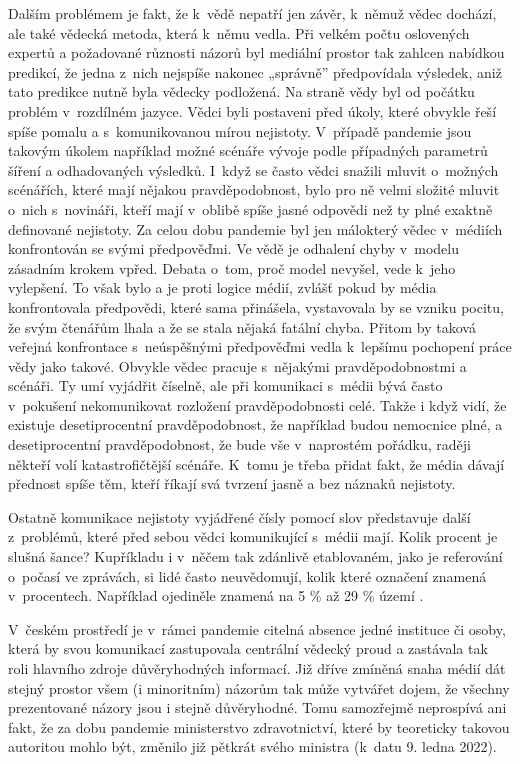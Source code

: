Dalším problémem je fakt, že k~vědě nepatří jen závěr, k~němuž vědec dochází, ale také vědecká metoda, která k~němu vedla. Při velkém počtu oslovených expertů a požadované  různosti názorů byl mediální prostor tak zahlcen nabídkou predikcí, že jedna z~nich nejspíše nakonec „správně” předpovídala výsledek, aniž tato predikce nutně byla vědecky podložená.
Na straně vědy byl od počátku problém v~rozdílném jazyce. Vědci byli postaveni před úkoly, které obvykle řeší spíše pomalu a s~komunikovanou mírou nejistoty. V~případě pandemie jsou takovým úkolem například možné scénáře vývoje podle případných parametrů šíření a odhadovaných výsledků. I~když se často vědci snažili mluvit o~možných scénářích, které mají nějakou pravděpodobnost, bylo pro ně velmi složité mluvit o~nich s~novináři, kteří mají v~oblibě spíše jasné odpovědi než ty plné exaktně definované nejistoty.
Za celou dobu pandemie byl jen málokterý vědec v~médiích konfrontován se svými předpověďmi. Ve vědě je odhalení chyby v~modelu zásadním krokem vpřed. Debata o~tom, proč model nevyšel, vede k~jeho vylepšení. To však bylo a je proti logice médií, zvlášť pokud by média konfrontovala předpovědi, které sama přinášela, vystavovala by se vzniku pocitu, že svým čtenářům lhala a že se stala nějaká fatální chyba. Přitom by taková veřejná konfrontace s~neúspěšnými předpověďmi vedla k~lepšímu pochopení práce vědy jako takové.
Obvykle vědec pracuje s~nějakými pravděpodobnostmi a scénáři. Ty umí vyjádřit číselně, ale při komunikaci s~médii bývá často v~pokušení nekomunikovat rozložení pravděpodobnosti celé. Takže i když vidí, že existuje desetiprocentní pravděpodobnost, že například budou nemocnice plné, a desetiprocentní pravděpodobnost, že bude vše v~naprostém pořádku, raději někteří volí katastrofičtější scénáře. K~tomu je třeba přidat fakt, že média dávají přednost spíše těm, kteří říkají svá tvrzení jasně a bez náznaků nejistoty.

Ostatně komunikace nejistoty vyjádřené čísly pomocí slov představuje další z~pro\-blé\-mů, které před sebou vědci komunikující s~médii mají. Kolik procent je slušná šance? Kupříkladu i v~něčem tak zdánlivě etablovaném, jako je referování o~počasí ve zprávách, si lidé často neuvědomují, kolik které označení znamená v~procentech. Například ojediněle znamená na 5 \% až 29 \% území \cite{Ceskyhydrometeorologickyustav}.

V~českém prostředí je v~rámci pandemie citelná absence jedné instituce či osoby, která by svou komunikací zastupovala centrální vědecký proud a zastávala tak roli hlavního zdroje důvěryhodných informací. Již dříve zmíněná snaha médií dát stejný prostor všem (i minoritním) názorům tak může vytvářet dojem, že všechny prezentované názory jsou i stejně důvěryhodné. Tomu samozřejmě neprospívá ani fakt, že za dobu pandemie ministerstvo zdravotnictví, které by teoreticky takovou autoritou mohlo být, změnilo již pětkrát svého ministra (k~datu 9. ledna 2022).

